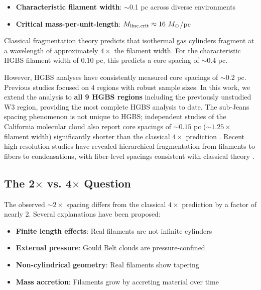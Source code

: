 \documentclass[11pt,a4paper]{article}
\begin{document}
\begin{itemize}
    \item \textbf{Characteristic filament width}: $\sim$0.1 pc across diverse environments \citep{Arzoumanian2011}
    \item \textbf{Critical mass-per-unit-length}: $M_{\rm line,crit} \approx 16~M_\odot$/pc \citep{Ostriker1964}
\end{itemize}

Classical fragmentation theory \citep{Inutsuka1992} predicts that isothermal gas cylinders fragment at a wavelength of approximately $4\times$ the filament width. For the characteristic HGBS filament width of $0.10$ pc, this predicts a core spacing of $\sim0.4$ pc.

However, HGBS analyses have consistently measured core spacings of $\sim0.2$ pc. Previous studies focused on 4 regions with robust sample sizes. In this work, we extend the analysis to \textbf{all 9 HGBS regions} including the previously unstudied W3 region, providing the most complete HGBS analysis to date. The sub-Jeans spacing phenomenon is not unique to HGBS; independent studies of the California molecular cloud also report core spacings of $\sim0.15$ pc ($\sim1.25\times$ filament width) significantly shorter than the classical $4\times$ prediction \citep{Zhang2024}. Recent high-resolution studies have revealed hierarchical fragmentation from filaments to fibers to condensations, with fiber-level spacings consistent with classical theory \citep{Yang2024}.

\subsection{The 2$\times$ vs. 4$\times$ Question}

The observed $\sim2\times$ spacing differs from the classical $4\times$ prediction by a factor of nearly 2. Several explanations have been proposed:
\begin{itemize}
    \item \textbf{Finite length effects}: Real filaments are not infinite cylinders
    \item \textbf{External pressure}: Gould Belt clouds are pressure-confined
    \item \textbf{Non-cylindrical geometry}: Real filaments show tapering
    \item \textbf{Mass accretion}: Filaments grow by accreting material over time \citep{Heitsch2013, Chen2024}
\end{itemize}
\end{document}
